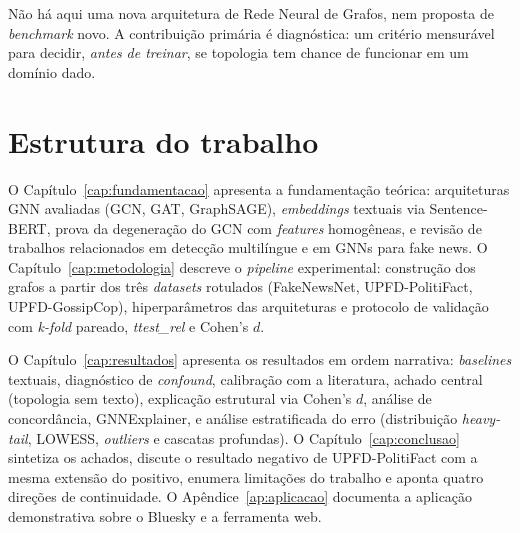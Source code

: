 N\~ao h\'a aqui uma nova arquitetura de Rede Neural de Grafos, nem
proposta de \emph{benchmark} novo. A contribui\c{c}\~ao prim\'aria \'e
diagn\'ostica: um crit\'erio mensur\'avel para decidir, \emph{antes de
treinar}, se topologia tem chance de funcionar em um dom\'inio dado.

\section{Estrutura do trabalho}
\label{sec:estrutura}

O Cap\'itulo~\ref{cap:fundamentacao} apresenta a fundamenta\c{c}\~ao
te\'orica: arquiteturas GNN avaliadas (GCN, GAT, GraphSAGE),
\emph{embeddings} textuais via Sentence-BERT, prova da
degenera\c{c}\~ao do GCN com \emph{features} homog\^eneas, e
revis\~ao de trabalhos relacionados em detec\c{c}\~ao multil\'ingue e
em GNNs para fake news. O Cap\'itulo~\ref{cap:metodologia} descreve o
\emph{pipeline} experimental: constru\c{c}\~ao dos grafos a partir dos
tr\^es \emph{datasets} rotulados (FakeNewsNet, UPFD-PolitiFact,
UPFD-GossipCop), hiperpar\^ametros das arquiteturas e protocolo de
valida\c{c}\~ao com \emph{k-fold} pareado, \emph{ttest\_rel} e Cohen's
$d$.

O Cap\'itulo~\ref{cap:resultados} apresenta os resultados em ordem
narrativa: \emph{baselines} textuais, diagn\'ostico de \emph{confound},
calibra\c{c}\~ao com a literatura, achado central (topologia sem
texto), explica\c{c}\~ao estrutural via Cohen's $d$, an\'alise de
concord\^ancia, GNNExplainer, e an\'alise estratificada do erro
(distribui\c{c}\~ao \emph{heavy-tail}, LOWESS, \emph{outliers} e
cascatas profundas). O Cap\'itulo~\ref{cap:conclusao} sintetiza os
achados, discute o resultado negativo de UPFD-PolitiFact com a mesma
extens\~ao do positivo, enumera limita\c{c}\~oes do trabalho e aponta
quatro dire\c{c}\~oes de continuidade. O Ap\^endice~\ref{ap:aplicacao}
documenta a aplica\c{c}\~ao demonstrativa sobre o Bluesky e a
ferramenta web.

